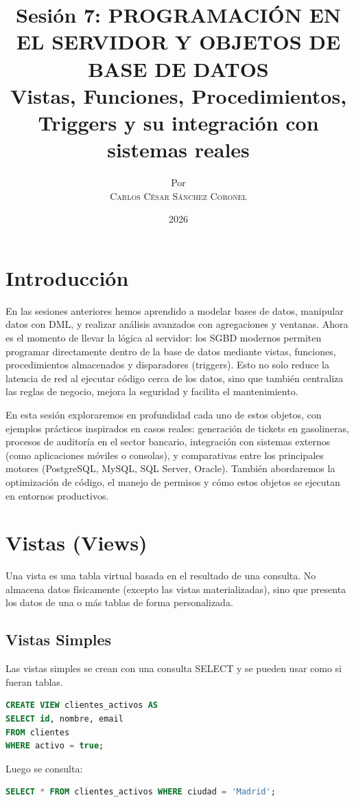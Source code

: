 \documentclass[12pt,a4paper,openany,oneside]{book}
\title{
    \Huge \textbf{Sesión 7: PROGRAMACIÓN EN EL SERVIDOR Y OBJETOS DE BASE DE DATOS} \\
    \large Vistas, Funciones, Procedimientos, Triggers y su integración con sistemas reales
}
\author{
    \small Por \\ \vspace{0.2cm}
    \Large \textsc{Carlos César Sánchez Coronel}
}
\date{2026}
\begin{document}
\maketitle

\tableofcontents
{}

\chapter{Introducción}
En las sesiones anteriores hemos aprendido a modelar bases de datos, manipular datos con DML, y realizar análisis avanzados con agregaciones y ventanas. Ahora es el momento de llevar la lógica al servidor: los SGBD modernos permiten programar directamente dentro de la base de datos mediante vistas, funciones, procedimientos almacenados y disparadores (triggers). Esto no solo reduce la latencia de red al ejecutar código cerca de los datos, sino que también centraliza las reglas de negocio, mejora la seguridad y facilita el mantenimiento.

En esta sesión exploraremos en profundidad cada uno de estos objetos, con ejemplos prácticos inspirados en casos reales: generación de tickets en gasolineras, procesos de auditoría en el sector bancario, integración con sistemas externos (como aplicaciones móviles o consolas), y comparativas entre los principales motores (PostgreSQL, MySQL, SQL Server, Oracle). También abordaremos la optimización de código, el manejo de permisos y cómo estos objetos se ejecutan en entornos productivos.

\chapter{Vistas (Views)}
Una vista es una tabla virtual basada en el resultado de una consulta. No almacena datos físicamente (excepto las vistas materializadas), sino que presenta los datos de una o más tablas de forma personalizada.

\section{Vistas Simples}
Las vistas simples se crean con una consulta SELECT y se pueden usar como si fueran tablas.
\begin{lstlisting}[language=SQL]
CREATE VIEW clientes_activos AS
SELECT id, nombre, email
FROM clientes
WHERE activo = true;
\end{lstlisting}
Luego se consulta:
\begin{lstlisting}[language=SQL]
SELECT * FROM clientes_activos WHERE ciudad = 'Madrid';
\end{lstlisting}
\end{document}
